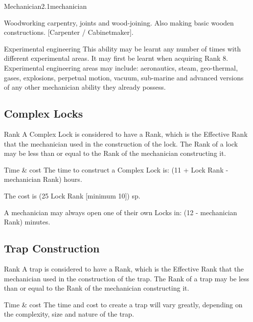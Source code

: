 \begin{skill}{Mechanician}{2.1}{mechanician}
\begin{Description}
\item[Woodworking]
carpentry, joints and wood-joining. Also making basic wooden
constructions. [Carpenter / Cabinetmaker].

\item[Experimental engineering]
This ability may be learnt any number of times with different
experimental areas. It may first be learnt when acquiring Rank 8.
Experimental engineering areas may include: aeronautics, steam,
geo-thermal, gases, explosions, perpetual motion, vacuum, sub-marine
and advanced versions of any other mechanician ability they already
possess.

\end{Description}

\subsection{Complex Locks}

\begin{Description}

\item[Rank]
A Complex Lock is considered to have a Rank, which is the Effective
Rank that the mechanician used in the construction of the lock.  The
Rank of a lock may be less than or equal to the Rank of the
mechanician constructing it.

\item[Time \& cost]
The time to construct a Complex Lock is: (11 + Lock Rank - mechanician
Rank) hours.

The cost is (25 \x Lock Rank [minimum 10]) sp.

\end{Description}

A mechanician may always open one of their own Locks in: (12 -
mechanician Rank) minutes.

\subsection{Trap Construction}
\label{mechanician:traps}
\begin{Description}

\item[Rank]
A trap is considered to have a Rank, which is the Effective Rank that
the mechanician used in the construction of the trap.  The Rank of a
trap may be less than or equal to the Rank of the mechanician
constructing it.

\item[Time \& cost]
The time and cost to create a trap will vary greatly, depending on the
complexity, size and nature of the trap.


\end{Description}
\end{skill}

